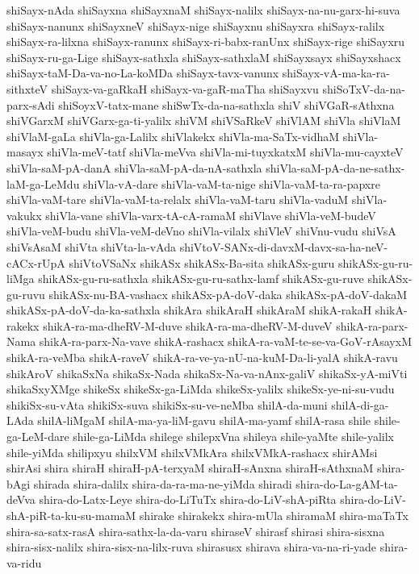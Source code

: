 {shiSayx-nAda
shiSayxna
shiSayxnaM
shiSayx-nalilx
shiSayx-na-nu-garx-hi-suva
shiSayx-nanunx
shiSayxneV
shiSayx-nige
shiSayxnu
shiSayxra
shiSayx-ralilx
shiSayx-ra-lilxna
shiSayx-ranunx
shiSayx-ri-babx-ranUnx
shiSayx-rige
shiSayxru
shiSayx-ru-ga-Lige
shiSayx-sathxla
shiSayx-sathxlaM
shiSayxsayx
shiSayxshacx
shiSayx-taM-Da-va-no-La-koMDa
shiSayx-tavx-vanunx
shiSayx-vA-ma-ka-ra-sithxteV
shiSayx-va-gaRkaH
shiSayx-va-gaR-maTha
shiSayxvu
shiSoTxV-da-na-parx-sAdi
shiSoyxV-tatx-mane
shiSwTx-da-na-sathxla
shiV
shiVGaR-sAthxna
shiVGarxM
shiVGarx-ga-ti-yalilx
shiVM
shiVSaRkeV
shiVlAM
shiVla
shiVlaM
shiVlaM-gaLa
shiVla-ga-Lalilx
shiVlakekx
shiVla-ma-SaTx-vidhaM
shiVla-masayx
shiVla-meV-tatf
shiVla-meVva
shiVla-mi-tuyxkatxM
shiVla-mu-cayxteV
shiVla-saM-pA-danA
shiVla-saM-pA-da-nA-sathxla
shiVla-saM-pA-da-ne-sathx-laM-ga-LeMdu
shiVla-vA-dare
shiVla-vaM-ta-nige
shiVla-vaM-ta-ra-papxre
shiVla-vaM-tare
shiVla-vaM-ta-relalx
shiVla-vaM-taru
shiVla-vaduM
shiVla-vakukx
shiVla-vane
shiVla-varx-tA-cA-ramaM
shiVlave
shiVla-veM-budeV
shiVla-veM-budu
shiVla-veM-deVno
shiVla-vilalx
shiVleV
shiVnu-vudu
shiVsA
shiVsAsaM
shiVta
shiVta-la-vAda
shiVtoV-SANx-di-davxM-davx-sa-ha-neV-cACx-rUpA
shiVtoVSaNx
shikASx
shikASx-Ba-sita
shikASx-guru
shikASx-gu-ru-liMga
shikASx-gu-ru-sathxla
shikASx-gu-ru-sathx-lamf
shikASx-gu-ruve
shikASx-gu-ruvu
shikASx-nu-BA-vashacx
shikASx-pA-doV-daka
shikASx-pA-doV-dakaM
shikASx-pA-doV-da-ka-sathxla
shikAra
shikAraH
shikAraM
shikA-rakaH
shikA-rakekx
shikA-ra-ma-dheRV-M-duve
shikA-ra-ma-dheRV-M-duveV
shikA-ra-parx-Nama
shikA-ra-parx-Na-vave
shikA-rashacx
shikA-ra-vaM-te-se-va-GoV-rAsayxM
shikA-ra-veMba
shikA-raveV
shikA-ra-ve-ya-nU-na-kuM-Da-li-yalA
shikA-ravu
shikAroV
shikaSxNa
shikaSx-Nada
shikaSx-Na-va-nAnx-galiV
shikaSx-yA-miVti
shikaSxyXMge
shikeSx
shikeSx-ga-LiMda
shikeSx-yalilx
shikeSx-ye-ni-su-vudu
shikiSx-su-vAta
shikiSx-suva
shikiSx-su-ve-neMba
shilA-da-muni
shilA-di-ga-LAda
shilA-liMgaM
shilA-ma-ya-liM-gavu
shilA-ma-yamf
shilA-rasa
shile
shile-ga-LeM-dare
shile-ga-LiMda
shilege
shilepxVna
shileya
shile-yaMte
shile-yalilx
shile-yiMda
shilipxyu
shilxVM
shilxVMkAra
shilxVMkA-rashacx
shirAMsi
shirAsi
shira
shiraH
shiraH-pA-terxyaM
shiraH-sAnxna
shiraH-sAthxnaM
shira-bAgi
shirada
shira-dalilx
shira-da-ra-ma-ne-yiMda
shiradi
shira-do-La-gAM-ta-deVva
shira-do-Latx-Leye
shira-do-LiTuTx
shira-do-LiV-shA-piRta
shira-do-LiV-shA-piR-ta-ku-su-mamaM
shirake
shirakekx
shira-mUla
shiramaM
shira-maTaTx
shira-sa-satx-rasA
shira-sathx-la-da-varu
shiraseV
shirasf
shirasi
shira-sisxna
shira-sisx-nalilx
shira-sisx-na-lilx-ruva
shirasusx
shirava
shira-va-na-ri-yade
shira-va-ridu
}
